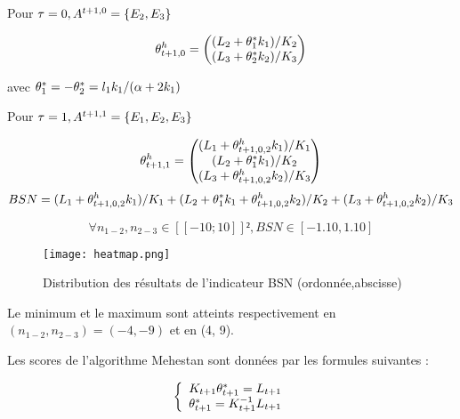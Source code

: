 Pour $\tau=0, A^{t+1,0}=\left\lbrace E_2,E_3 \right\rbrace$

\begin{align*}
    \theta^h_{t+1,0}= \begin{pmatrix}
(L_2+\theta^*_{1} k_1) / K_2 \\
(L_3+\theta^*_{2} k_2) / K_3
\end{pmatrix}
\end{align*}


avec $\theta^*_{1} = - \theta^*_{2} = l_1 k_1/(\alpha + 2 k_1)$

Pour $\tau=1, A^{t+1,1}=\left\lbrace E_1,E_2,E_3 \right\rbrace$

\begin{align*}
  \theta^h_{t+1,1}= \begin{pmatrix}
(L_1+\theta^h_{t+1,0,2} k_1) / K_1 \\
(L_2+\theta^*_{1} k_1) / K_2 \\
(L_3+\theta^h_{t+1,0,2} k_2) / K_3 
\end{pmatrix}
\end{align*}
\begin{align*}
BSN =
(L_1+\theta^h_{t+1,0,2} k_1) / K_1 +
(L_2+\theta^*_{1} k_1 + \theta^h_{t+1,0,2} k_2)  / K_2 +
(L_3+\theta^h_{t+1,0,2} k_2) / K_3 
\end{align*}

\begin{equation*}
    \forall{n_{1-2},n_{2-3}}\in [\![-10;10]\!]² , BSN \in [-1.10,1.10]
\end{equation*}

\begin{figure}[ht]
  \texttt{[image: heatmap.png]}
  \caption{Distribution des résultats de l'indicateur BSN (ordonnée,abscisse)}
\end{figure}

Le minimum et le maximum sont atteints respectivement en $(n_{1-2},n_{2-3})=(-4, -9)$ et en (4, 9).


Les scores de l'algorithme Mehestan sont données par les formules suivantes :

\begin{align*}
    \left\{
                \begin{array}{ll}
                K_{t+1} \theta^*_{t+1}= L_{t+1} \\
                \theta^*_{t+1}=K^{-1}_{t+1} L_{t+1}\\
                \end{array}
              \right.
\end{align*}

